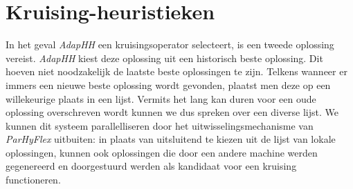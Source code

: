 \section{Kruising-heuristieken}

In het geval \emph{AdapHH} een kruisingsoperator selecteert, is een tweede oplossing vereist. \emph{AdapHH} kiest deze oplossing uit een historisch beste oplossing. Dit hoeven niet noodzakelijk de laatste beste oplossingen te zijn. Telkens wanneer er immers een nieuwe beste oplossing wordt gevonden, plaatst men deze op een willekeurige plaats in een lijst. Vermits het lang kan duren voor een oude oplossing overschreven wordt kunnen we dus spreken over een diverse lijst. We kunnen dit systeem parallelliseren door het uitwisselingsmechanisme van \emph{ParHyFlex} uitbuiten: in plaats van uitsluitend te kiezen uit de lijst van lokale oplossingen, kunnen ook oplossingen die door een andere machine werden gegenereerd en doorgestuurd werden als kandidaat voor een kruising functioneren.